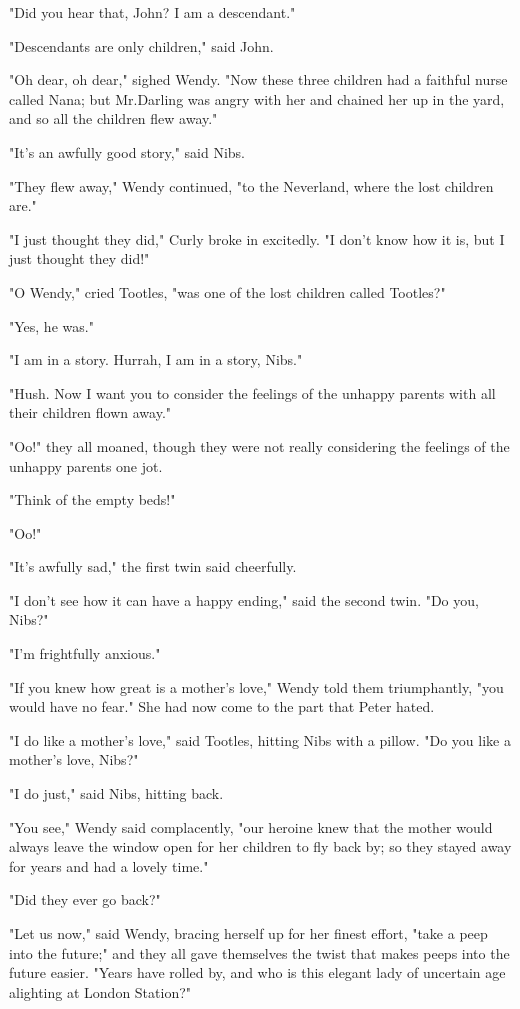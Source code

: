 "Did you hear that, John?
I am a descendant."

"Descendants are only children," said John.

"Oh dear, oh dear," sighed Wendy.
"Now these three children had a faithful nurse called Nana;
but Mr.\@ Darling was angry with her and chained her up in the yard, and so all the children flew away."

"It's an awfully good story," said Nibs.

"They flew away," Wendy continued, "to the Neverland, where the lost children are."

"I just thought they did," Curly broke in excitedly.
"I don't know how it is, but I just thought they did!"

"O Wendy," cried Tootles, "was one of the lost children called Tootles?"

"Yes, he was."

"I am in a story.
Hurrah, I am in a story, Nibs."

"Hush.
Now I want you to consider the feelings of the unhappy parents with all their children flown away."

"Oo!\@" they all moaned, though they were not really considering the feelings of the unhappy parents one jot.

"Think of the empty beds!"

"Oo!"

"It's awfully sad," the first twin said cheerfully.

"I don't see how it can have a happy ending," said the second twin.
"Do you, Nibs?"

"I'm frightfully anxious."

"If you knew how great is a mother's love," Wendy told them triumphantly, "you would have no fear."
She had now come to the part that Peter hated.

"I do like a mother's love," said Tootles, hitting Nibs with a pillow.
"Do you like a mother's love, Nibs?"

"I do just," said Nibs, hitting back.

"You see," Wendy said complacently, "our heroine knew that the mother would always leave the window open for her children to fly back by;
so they stayed away for years and had a lovely time."

"Did they ever go back?"

"Let us now," said Wendy, bracing herself up for her finest effort, "take a peep into the future;" and they all gave themselves the twist that makes peeps into the future easier.
"Years have rolled by, and who is this elegant lady of uncertain age alighting at London Station?"

